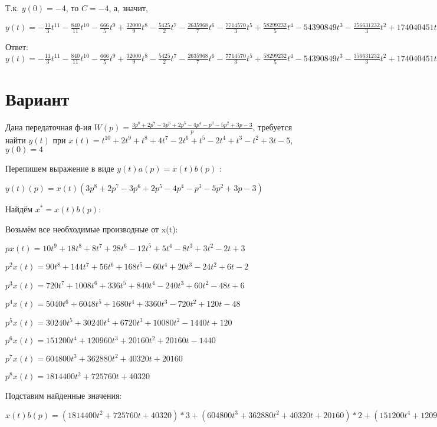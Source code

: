 \documentclass{article}
\begin{document}
{{{{{Т.к. $y(0)=-4$, то $C=-4$, а, значит, 

$y(t)=-\frac{11}{3}t^{11}-\frac{840}{11}t^{10}-\frac{666}{5}t^{9}+\frac{32000}{9}t^{8}-\frac{5425}{2}t^{7}-\frac{2635968}{7}t^{6}-\frac{7714570}{3}t^{5}+\frac{58299232}{5}t^{4}-54390849t^{3}-\frac{356631232}{3}t^{2}+174040451t-4$

Ответ: $y(t) = -\frac{11}{3}t^{11}-\frac{840}{11}t^{10}-\frac{666}{5}t^{9}+\frac{32000}{9}t^{8}-\frac{5425}{2}t^{7}-\frac{2635968}{7}t^{6}-\frac{7714570}{3}t^{5}+\frac{58299232}{5}t^{4}-54390849t^{3}-\frac{356631232}{3}t^{2}+174040451t-4$

\section{Вариант}

Дана передаточная ф-ия $W(p)=\frac{3p^{8}+2p^{7}-3p^{6}+2p^{5}-4p^{4}-p^{3}-5p^{2}+3p-3}{p}$, требуется найти $y(t)$ при $x(t)=t^{10}+2t^{9}+t^{8}+4t^{7}-2t^{6}+t^{5}-2t^{4}+t^{3}-t^{2}+3t-5$, $y(0)=4$

Перепишем выражение в виде $y(t)a(p)=x(t)b(p)$ :

$y(t)(p)=x(t)(3p^{8}+2p^{7}-3p^{6}+2p^{5}-4p^{4}-p^{3}-5p^{2}+3p-3)$

Найдём $x^*=x(t)b(p)$:

Возьмём все необходимые производные от x(t):

$px(t)=10t^{9}+18t^{8}+8t^{7}+28t^{6}-12t^{5}+5t^{4}-8t^{3}+3t^{2}-2t+3$

$p^2x(t)=90t^{8}+144t^{7}+56t^{6}+168t^{5}-60t^{4}+20t^{3}-24t^{2}+6t-2$

$p^3x(t)=720t^{7}+1008t^{6}+336t^{5}+840t^{4}-240t^{3}+60t^{2}-48t+6$

$p^4x(t)=5040t^{6}+6048t^{5}+1680t^{4}+3360t^{3}-720t^{2}+120t-48$

$p^5x(t)=30240t^{5}+30240t^{4}+6720t^{3}+10080t^{2}-1440t+120$

$p^6x(t)=151200t^{4}+120960t^{3}+20160t^{2}+20160t-1440$

$p^7x(t)=604800t^{3}+362880t^{2}+40320t+20160$

$p^8x(t)=1814400t^{2}+725760t+40320$

Подставим найденные значения:

$x(t)b(p) = (1814400t^{2}+725760t+40320)*3+(604800t^{3}+362880t^{2}+40320t+20160)*2+(151200t^{4}+120960t^{3}+20160t^{2}+20160t-1440)*(-3)+(30240t^{5}+30240t^{4}+6720t^{3}+10080t^{2}-1440t+120)*2+(5040t^{6}+6048t^{5}+1680t^{4}+3360t^{3}-720t^{2}+120t-48)*(-4)+(720t^{7}+1008t^{6}+336t^{5}+840t^{4}-240t^{3}+60t^{2}-48t+6)*(-1)+(90t^{8}+144t^{7}+56t^{6}+168t^{5}-60t^{4}+20t^{3}-24t^{2}+6t-2)*(-5)+(10t^{9}+18t^{8}+8t^{7}+28t^{6}-12t^{5}+5t^{4}-8t^{3}+3t^{2}-2t+3)*3+(10t^{9}+18t^{8}+8t^{7}+28t^{6}-12t^{5}+5t^{4}-8t^{3}+3t^{2}-2t+3)*(-3)=-450t^{8}-1440t^{7}-21448t^{6}+35112t^{5}-400380t^{4}+846860t^{3}+6131580t^{2}+2194098t$





}}}}}
\end{document}
